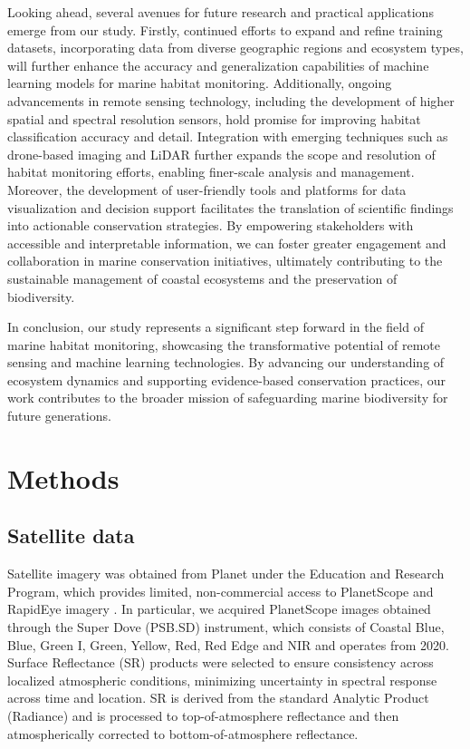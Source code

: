 Looking ahead, several avenues for future research and practical applications
emerge from our study. Firstly, continued efforts to expand and refine training
datasets, incorporating data from diverse geographic regions and ecosystem
types, will further enhance the accuracy and generalization capabilities of
machine learning models for marine habitat monitoring. Additionally, ongoing
advancements in remote sensing technology, including the development of higher
spatial and spectral resolution sensors, hold promise for improving habitat
classification accuracy and detail. Integration with emerging techniques such
as drone-based imaging and LiDAR further expands the scope and resolution of
habitat monitoring efforts, enabling finer-scale analysis and management.
Moreover, the development of user-friendly tools and platforms for data
visualization and decision support facilitates the translation of scientific
findings into actionable conservation strategies. By empowering stakeholders
with accessible and interpretable information, we can foster greater engagement
and collaboration in marine conservation initiatives, ultimately contributing
to the sustainable management of coastal ecosystems and the preservation of
biodiversity.

In conclusion, our study represents a significant step forward in the field of
marine habitat monitoring, showcasing the transformative potential of remote
sensing and machine learning technologies. By advancing our understanding of
ecosystem dynamics and supporting evidence-based conservation practices, our
work contributes to the broader mission of safeguarding marine biodiversity for
future generations.

\section{Methods}

\subsection{Satellite data}

Satellite imagery was obtained from Planet under the Education and Research
Program, which provides limited, non-commercial access to PlanetScope and
RapidEye imagery \cite{planet2017}. In particular, we acquired PlanetScope
images obtained through the Super Dove (PSB.SD) instrument, which consists of
Coastal Blue, Blue, Green I, Green, Yellow, Red, Red Edge and NIR and operates
from 2020. Surface Reflectance (SR) products were selected to ensure
consistency across localized atmospheric conditions, minimizing uncertainty in
spectral response across time and location. SR is derived from the standard
Analytic Product (Radiance) and is processed to top-of-atmosphere reflectance
and then atmospherically corrected to bottom-of-atmosphere reflectance.

